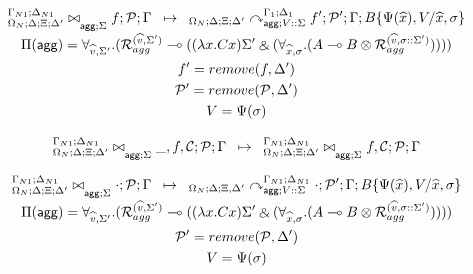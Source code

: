 
\[
\underset{
   \begin{gathered}
   \Pi(\m{agg}) = \forall_{\widehat{v}, \Sigma'}.
   (\defstwo{agg}{\widehat{v}}{\Sigma'} \lolli ((\lambda x. C x)\Sigma' \with (\forall_{\widehat{x}, \sigma}.
                                                (A \lolli B \otimes
                                                 \defstwo{agg}{\widehat{v}}{\sigma
                                                 ::\Sigma'})))) \\
   f' = remove(f, \Delta') \\
   \lstack{P'} = remove(\lstack{P}, \Delta') \\
   V = \Psi(\sigma)
   \end{gathered}
}
{
   \trans{
      \fixstatea{\Delta}{\Xi; \Delta'}{f; \lstack{P}}{\Gamma}{\Sigma}
   }
   {
      \derstatea{\Delta}{\Xi; \Delta'}{\Gamma_1}{\Delta_1}{V :: \Sigma}{f';
         \lstack{P'}}{B\{\Psi(\widehat{x}), V / \widehat{x}, \sigma \}}
   }
}
\]

\[
\trans{
   \fixstatea{\Delta}{\Xi; \Delta'}{\_, f, \lstack{C}; \lstack{P}}{\Gamma}{\Sigma}
}
{
   \fixstatea{\Delta}{\Xi; \Delta'}{f, \lstack{C}; \lstack{P}}{\Gamma}{\Sigma}
}
\]

\[
\underset{
   \begin{gathered}
   \Pi(\m{agg}) = \forall_{\widehat{v}, \Sigma'}.
   (\defstwo{agg}{\widehat{v}}{\Sigma'} \lolli ((\lambda x. C x)\Sigma' \with (\forall_{\widehat{x}, \sigma}.
                                                (A \lolli B \otimes
                                                 \defstwo{agg}{\widehat{v}}{\sigma
                                                 ::\Sigma'})))) \\
   \lstack{P'} = remove(\lstack{P}, \Delta') \\
   V = \Psi(\sigma)
   \end{gathered}
}
{
   \trans{
      \fixstatea{\Delta}{\Xi; \Delta'}{\cdot; \lstack{P}}{\Gamma}{\Sigma}
   }
   {
      \derstatea{\Delta}{\Xi, \Delta'}{\Gamma_{N1}}{\Delta_{N1}}{V :: \Sigma}{\cdot;
         \lstack{P}'}{B\{\Psi(\widehat{x}), V / \widehat{x}, \sigma \}}
   }
}
\]
